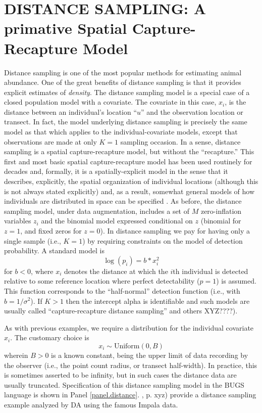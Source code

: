 \section{DISTANCE SAMPLING: A primative Spatial Capture-Recapture Model} 

Distance sampling is one of the most popular methods for estimating
animal abundance. One of the great benefits of distance sampling is
that it provides explicit estimates of {\it density}. The distance
sampling model is a special case of a closed population model with a
covariate. The covariate in this case, $x_{i}$, is the distance
between an individual's location ``$u$'' and the observation location
or transect. In fact, the model underlying distance sampling is
precisely the same model as that which applies to the
individual-covariate models, except that observations are made at only
$K=1$ sampling occasion. In a sense, distance sampling is a spatial
capture-recapture model, but without the ``recapture.''  This first
and most basic spatial capture-recapture model has been used routinely
for decades and, formally, it is a spatially-explicit model in the
sense that it describes, explicitly, the spatial organization of
individual locations (although this is not always stated explicitly)
and, as a result, somewhat general models of how individuals are
distributed in space can be specified \citep{royle_etal:2004,
  johnson_etal:2010, sillett_etal:2011}. 
As before, the distance sampling model, under data augmentation, includes a set of $M$ zero-inflation variables $z_{i}$ and the binomial model expressed conditional on $z$ (binomial for $z=1$, and fixed zeros for $z=0$).  In distance sampling we pay for having only a single sample (i.e., $K=1$) by requiring constraints on the model of detection probability. A standard model is
\[
\log(p_{i}) = b * x_{i}^{2}
\]
for $b < 0$, where $x_i$ denotes the distance at which the $i$th
individual is detected relative to some reference location where
perfect detectability ($p=1$) is assumed. This function corresponds to
the ``half-normal'' detection function (i.e., with $b =
1/\sigma^{2}$).  If $K>1$ then the intercept alpha is identifiable and
such models are usually called ``capture-recapture distance
sampling''\citep{borchers_etal:XXXX} and others XYZ????).  

As with previous examples, we require a distribution for the individual covariate $x_{i}$. The customary choice is
\[
x_{i} \sim \mbox{Uniform}(0,B)
\]
wherein $B>0$ is a known constant, being the upper limit of data
recording by the observer (i.e., the point count radius, or transect
half-width). In practice, this is sometimes asserted to be infinity,
but in such cases the distance data are usually truncated.
Specification of this distance sampling model in the BUGS language is
shown in Panel \ref{panel.distance}. \citet{royle_dorazio:2008}, p. xyz) provide a distance sampling example analyzed by DA using the famous Impala data. 


